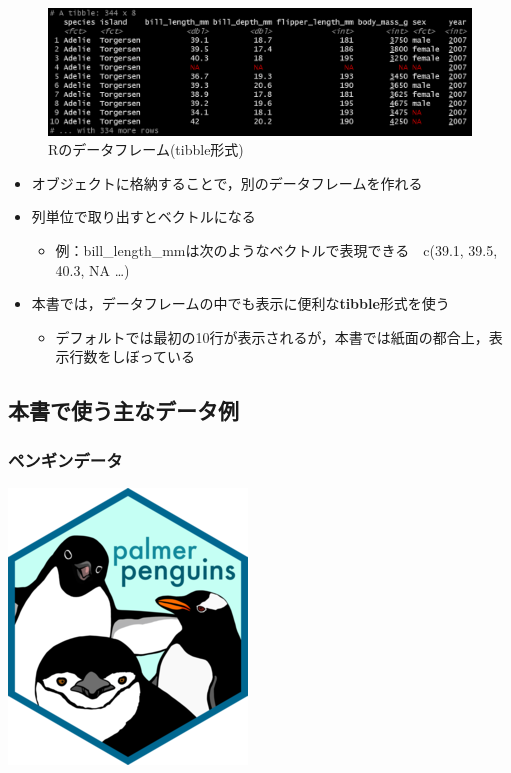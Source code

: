 \documentclass[
  xelatex,ja=standard, b5paper]{bxjsbook}
\providecommand{\tightlist}{%
  \setlength{\itemsep}{0pt}\setlength{\parskip}{0pt}}
\begin{document}
\begin{figure}

{\centering \includegraphics[width=0.8\linewidth]{images/dfr} 

}

\caption{Rのデータフレーム(tibble形式)}\label{fig:dfr}
\end{figure}

\begin{itemize}
\tightlist
\item
  オブジェクトに格納することで，別のデータフレームを作れる
\item
  列単位で取り出すとベクトルになる

  \begin{itemize}
  \tightlist
  \item
    例：bill\_length\_mmは次のようなベクトルで表現できる　c(39.1, 39.5, 40.3, NA \ldots)
  \end{itemize}
\item
  本書では，データフレームの中でも表示に便利な\textbf{tibble}形式を使う

  \begin{itemize}
  \tightlist
  \item
    デフォルトでは最初の10行が表示されるが，本書では紙面の都合上，表示行数をしぼっている
  \end{itemize}
\end{itemize}

\hypertarget{p-df-main}{%
\subsection{本書で使う主なデータ例}\label{p-df-main}}

\hypertarget{p-df-main-p}{%
\subsubsection{ペンギンデータ}\label{p-df-main-p}}

\includegraphics{images/penguins_logo.png}
\end{document}
